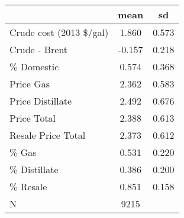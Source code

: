 {
\def\sym#1{\ifmmode^{#1}\else\(^{#1}\)\fi}
\begin{tabular}{l*{1}{cc}}
\toprule
                &     mean&       sd\\
\midrule
Crude cost (2013 \$/gal)&    1.860&    0.573\\
Crude - Brent   &   -0.157&    0.218\\
\% Domestic     &    0.574&    0.368\\
Price Gas       &    2.362&    0.583\\
Price Distillate&    2.492&    0.676\\
Price Total     &    2.388&    0.613\\
Resale Price Total&    2.373&    0.612\\
\% Gas          &    0.531&    0.220\\
\% Distillate   &    0.386&    0.200\\
\% Resale       &    0.851&    0.158\\
\midrule
N               &     9215&         \\
\bottomrule
\end{tabular}
}
